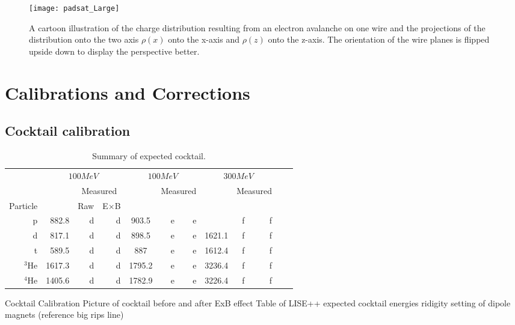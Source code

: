 \begin{figure}[H]
\texttt{[image: padsat\_Large]}
\caption{A cartoon illustration of the charge distribution resulting from an electron avalanche on one wire and the projections of the distribution onto the two axis $\rho(x)$ onto the x-axis and $\rho(z)$ onto the z-axis. The orientation of the wire planes is flipped upside down to display the perspective better.}
\label{fig:prf}
\end{figure}



\section{Calibrations and Corrections}


\subsection{Cocktail calibration}

\begin{table*}\centering
{}
\begin{tabular}{@{}rrrrcrrrcrrr@{}}\toprule
& \multicolumn{3}{c}{$100 MeV$} & \multicolumn{3}{c}{$100 MeV$} & \multicolumn{3}{c}{$300 MeV$}\\
\cmidrule{2-4} \cmidrule{6-8} \cmidrule{10-12}
& &\multicolumn{2}{c}{Measured} & & \multicolumn{2}{c}{Measured} & & \multicolumn{2}{c}{Measured}\\
\cmidrule{3-4} \cmidrule{7-8} \cmidrule{11-12}
Particle &\phantom{abc} & Raw & E$\times$B\\
\midrule
p   & 882.8 & d & d & 903.5 & e & e &\phantom{abcdef} & f & f \\
d   & 817.1 & d & d & 898.5 & e & e & 1621.1 & f & f\\
t   & 589.5 & d & d & 887 & e & e & 1612.4 & f & f  \\
$^{3}$He  & 1617.3  & d & d & 1795.2 & e & e & 3236.4 & f & f\\
$^{4}$He  & 1405.6  & d & d & 1782.9 & e & e & 3226.4 & f & f \\
\bottomrule
\end{tabular}
\caption{Summary of expected cocktail. }
\label{tb:cocktailsummary}
\end{table*}

Cocktail Calibration 
Picture of cocktail before and after ExB effect
Table of LISE++ expected cocktail energies ridigity setting of dipole magnets (reference big rips line)




